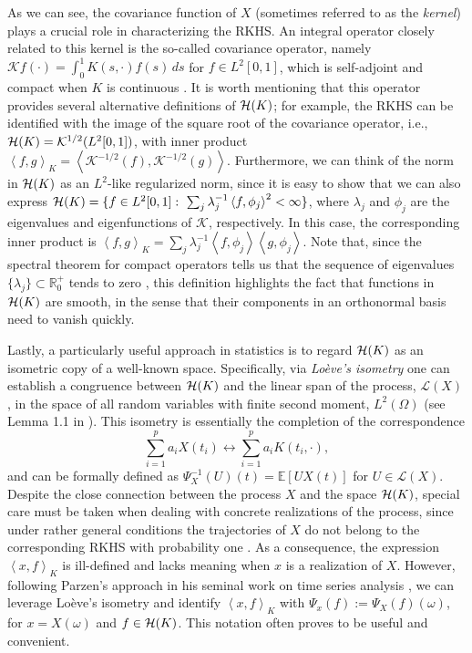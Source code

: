 \documentclass[ba]{imsart}
\numberwithin{equation}{section}
\theoremstyle{plain}
\newcommand{\R}{\mathbb{R}}
\newcommand{\E}{\mathbb{E}}
\newcommand{\Hcal}{\ensuremath\mathcal{H}}
\newcommand\dotprod[2]{\left\langle #1, #2 \right\rangle}
\begin{document}
As we can see, the covariance function of \(X\) (sometimes referred to as the \textit{kernel}) plays a crucial role in characterizing the RKHS. An integral operator closely related to this kernel is the so-called covariance operator, namely \(\mathcal Kf(\cdot) = \int_0^1 K(s, \cdot)f(s)\, ds\) for \(f \in L^2[0, 1]\), which is self-adjoint and compact when \(K\) is continuous \citep[e.g.][Th.~4.6.2]{hsing2015theoretical}. It is worth mentioning that this operator provides several alternative definitions of \(\Hcal(K)\); for example, the RKHS can be identified with the image of the square root of the covariance operator, i.e., \(\Hcal(K) = \mathcal K^{1/2}(L^2[0, 1])\), with inner product \(\dotprod{f}{g}_K = \dotprod{\mathcal K^{-1/2}(f)}{\mathcal K^{-1/2}(g)}\). Furthermore, we can think of the norm in \(\Hcal(K)\) as an \(L^2\)-like regularized norm, since it is easy to show that we can also express \(\Hcal(K) = \{f \in L^2[0, 1]: \ \sum_j \lambda_j^{-1}\dotprod{f}{\phi_j}^2 < \infty \}\), where \(\lambda_j\) and \(\phi_j\) are the eigenvalues and eigenfunctions of \(\mathcal K\), respectively. In this case, the corresponding inner product is \(\dotprod{f}{g}_K = \sum_j \lambda_j^{-1}\dotprod{f}{\phi_j}\dotprod{g}{\phi_j}\). Note that, since the spectral theorem for compact operators tells us that the sequence of eigenvalues \(\{\lambda_j\}\subset \R^+_0\) tends to zero \citep[e.g.][Th.~4.2.4]{hsing2015theoretical}, this definition highlights the fact that functions in \(\Hcal(K)\) are smooth, in the sense that their components in an orthonormal basis need to vanish quickly.

Lastly, a particularly useful approach in statistics is to regard \(\Hcal(K)\) as an isometric copy of a well-known space. Specifically, via \textit{Loève's isometry} one can establish a congruence between \(\Hcal(K)\) and the linear span of the process, \(\mathcal L(X)\), in the space of all random variables with finite second moment, \(L^2(\Omega)\) (see Lemma 1.1 in \citet{lukic2001stochastic}). This isometry is essentially the completion of the correspondence
  \[
  \sum_{i=1}^p a_i X(t_i) \longleftrightarrow \sum_{i=1}^p a_i K(t_i, \cdot),
\]
and can be formally defined as \(\Psi^{-1}_X(U)(t) = \E[U X(t)]\) for \(U \in \mathcal L(X)\).
Despite the close connection between the process \(X\) and the space \(\Hcal(K)\), special care must be taken when dealing with concrete realizations of the process, since under rather general conditions the trajectories of \(X\) do not belong to the corresponding RKHS with probability one \citep[see for example][Cor.~7.1]{lukic2001stochastic}. As a consequence, the expression \(\dotprod{x}{f}_K\) is ill-defined and lacks meaning when \(x\) is a realization of \(X\). However, following Parzen's approach in his seminal work on time series analysis \citep[Th.~4E]{parzen1961approach}, we can leverage Loève's isometry and identify \(\dotprod{x}{f}_K \) with \( \Psi_x(f) := \Psi_X(f)(\omega)\), for \(x=X(\omega)\) and \(f\in \Hcal(K)\). This notation often proves to be useful and convenient.
\end{document}
